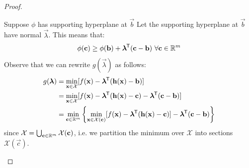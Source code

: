 \documentclass[../main.tex]{subfiles}
\begin{document}
\begin{proof}
  \begin{proofdirection}{Suppose $\phi$ has supporting hyperplane at $\vec{b}$}
    Let the supporting hyperplane at $\vec{b}$ have normal $\vec{\lambda}$.
    This means that:
    \[
      \phi(\mathbf{\bm{c}}) \geq \phi(\mathbf{\bm{b}}) + \mathbf{\bm{\lambda}}^{{\mkern-1.5mu\mathsf{T}}}(\mathbf{\bm{c}} - \mathbf{\bm{b}})\ \forall \mathbf{\bm{c}} \in \mathbb{R}^{m}
    \]
    Observe that we can rewrite $g(\vec{\lambda})$ as follows:
    \begin{align*}
      g(\mathbf{\bm{\lambda}}) &= \min_{\mathbf{\bm{x}} \in \mathcal{X}} [f(\mathbf{\bm{x}}) - \mathbf{\bm{\lambda}}^{{\mkern-1.5mu\mathsf{T}}}(\mathbf{\bm{h}}(\mathbf{\bm{x}}) - \mathbf{\bm{b}})] \\
                       &= \min_{\mathbf{\bm{x}} \in \mathcal{X}} [f(\mathbf{\bm{x}}) - \mathbf{\bm{\lambda}}^{{\mkern-1.5mu\mathsf{T}}}(\mathbf{\bm{h}}(\mathbf{\bm{x}}) - \mathbf{\bm{c}}) - \mathbf{\bm{\lambda}}^{{\mkern-1.5mu\mathsf{T}}}(\mathbf{\bm{c}} - \mathbf{\bm{b}})] \\
                       &= \min_{\mathbf{\bm{c}} \in \mathbb{R}^{m}} \left\{\min_{\mathbf{\bm{x}} \in \mathcal{X}(\mathbf{\bm{c}})} [f(\mathbf{\bm{x}}) - \mathbf{\bm{\lambda}}^{{\mkern-1.5mu\mathsf{T}}}(\mathbf{\bm{h}}(\mathbf{\bm{x}}) - \mathbf{\bm{c}})] - \mathbf{\bm{\lambda}}^{{\mkern-1.5mu\mathsf{T}}}(\mathbf{\bm{c}} - \mathbf{\bm{b}})\right\}
    \end{align*}
    since $\mathcal{X} = \bigcup_{\mathbf{\bm{c}} \in \mathbb{R}^{m}} \mathcal{X}(\mathbf{\bm{c}})$, i.e. we partition the minimum over $\mathcal{X}$ into sections $\mathcal{X}(\vec{c})$.


\end{proofdirection}
\end{proof}
\end{document}
